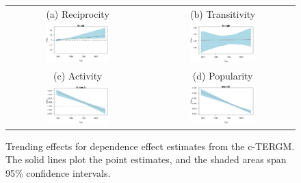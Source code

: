 \documentclass[headsepline=true, abstracton]{scrartcl}
\begin{document}
\begin{figure}[H]
 \begin{tabular}{cc}

   (a) Reciprocity & (b) Transitivity \\
\includegraphics[width = 0.475\textwidth, trim= 0.1cm 1cm 0.5cm .45cm,clip=true]{images/mutual_coef_trend_linear.pdf} & \includegraphics[width = 0.475\textwidth, trim= 0.1cm 1cm 0.5cm .45cm,clip=true]{images/triangle_coef_trend_linear.pdf} \\
 
    (c) Activity & (d) Popularity \\
\includegraphics[width = 0.475\textwidth, trim= 0.1cm 1cm 0.5cm .45cm,clip=true]{images/o2star_coef_trend_linear.pdf} & \includegraphics[width = 0.475\textwidth, trim= 0.1cm 1cm 0.5cm .45cm,clip=true]{images/i2star_coef_trend_linear.pdf} \\
 

 
\end{tabular}
\caption{Trending effects for dependence effect estimates from the c-TERGM. The solid lines plot the point estimates, and the shaded areas span 95\% confidence intervals. }
 \label{fig:coeftrends_endo}
\vspace{-.25cm}
\end{figure} 
\end{document}
